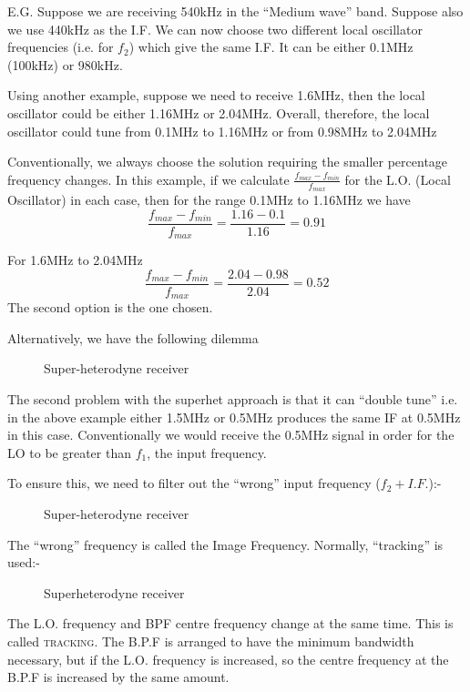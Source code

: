 \documentclass[11pt]{article} %
\begin{document}
	E.G. Suppose we are receiving 540kHz in the ``Medium wave'' band. Suppose also we use 440kHz as the I.F. We can now choose two different local oscillator frequencies (i.e. for $f_2$) which give the same I.F. 
	It can be either 0.1MHz (100kHz) or 980kHz.

	Using another example, suppose we need to receive 1.6MHz, then the local oscillator could be either 1.16MHz or 2.04MHz. Overall, therefore, the local oscillator could tune from 0.1MHz to 1.16MHz or from 0.98MHz to 2.04MHz

	Conventionally, we always choose the solution requiring the smaller percentage frequency changes. In this example, if we calculate $\frac{f_{max}-f_{min}}{f_{max}}$ for the L.O. 
	(Local Oscillator) in each case, then for the range 0.1MHz to 1.16MHz we have
	\begin{equation}
		\frac{f_{max}-f_{min}}{f_{max}} = \frac{1.16-0.1}{1.16} = 0.91
	\end{equation}

	For 1.6MHz to 2.04MHz
	\begin{equation}
		\frac{f_{max}-f_{min}}{f_{max}} = \frac{2.04-0.98}{2.04} = 0.52
	\end{equation}
	The second option is the one chosen.

	Alternatively, we have the following dilemma
	\begin{figure}[h]
		\centering
		\begin{tikzpicture}
		\end{tikzpicture}
		\label{fig:superhetex}
		\caption{Super-heterodyne receiver}
	\end{figure}

	The second problem with the superhet approach is that it can ``double tune'' i.e. in the above example either 1.5MHz or 0.5MHz produces the same IF at 0.5MHz in this case.
	Conventionally we would receive the 0.5MHz signal in order for the LO to be greater than $f_1$, the input frequency.

	To ensure this, we need to filter out the ``wrong'' input frequency ($f_2+I.F.$):-
	\begin{figure}[h]
		\centering
		\begin{tikzpicture}
		\end{tikzpicture}
		\label{fig:superhetbpf}
		\caption{Super-heterodyne receiver}
	\end{figure}

	The ``wrong'' frequency is called the Image Frequency. Normally, ``tracking'' is used:-
	\begin{figure}[h]
		\centering
		\begin{tikzpicture}
		\end{tikzpicture}
		\label{fig:superhettracking}
		\caption{Superheterodyne receiver}
	\end{figure}

	The L.O. frequency and BPF centre frequency change at the same time. This is called \textsc{tracking}. The B.P.F is arranged to have the minimum bandwidth necessary, but if the L.O. frequency is increased, so the centre frequency at the B.P.F is increased by the same amount.
\end{document}
